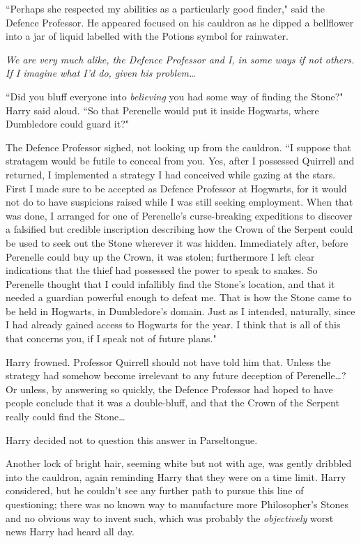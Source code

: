``Perhaps she respected my abilities as a particularly good finder," said the Defence Professor. He appeared focused on his cauldron as he dipped a bellflower into a jar of liquid labelled with the Potions symbol for rainwater.

\emph{We are very much alike, the Defence Professor and I, in some ways if not others. If I imagine what I'd do, given his problem…}

``Did you bluff everyone into \emph{believing} you had some way of finding the Stone?" Harry said aloud. ``So that Perenelle would put it inside Hogwarts, where Dumbledore could guard it?"

The Defence Professor sighed, not looking up from the cauldron. ``I suppose that stratagem would be futile to conceal from you. Yes, after I possessed Quirrell and returned, I implemented a strategy I had conceived while gazing at the stars. First I made sure to be accepted as Defence Professor at Hogwarts, for it would not do to have suspicions raised while I was still seeking employment. When that was done, I arranged for one of Perenelle's curse-breaking expeditions to discover a falsified but credible inscription describing how the Crown of the Serpent could be used to seek out the Stone wherever it was hidden. Immediately after, before Perenelle could buy up the Crown, it was stolen; furthermore I left clear indications that the thief had possessed the power to speak to snakes. So Perenelle thought that I could infallibly find the Stone's location, and that it needed a guardian powerful enough to defeat me. That is how the Stone came to be held in Hogwarts, in Dumbledore's domain. Just as I intended, naturally, since I had already gained access to Hogwarts for the year. I think that is all of this that concerns you, if I speak not of future plans."

Harry frowned. Professor Quirrell should not have told him that. Unless the strategy had somehow become irrelevant to any future deception of Perenelle…? Or unless, by answering so quickly, the Defence Professor had hoped to have people conclude that it was a double-bluff, and that the Crown of the Serpent really could find the Stone…

Harry decided not to question this answer in Parseltongue.

Another lock of bright hair, seeming white but not with age, was gently dribbled into the cauldron, again reminding Harry that they were on a time limit. Harry considered, but he couldn't see any further path to pursue this line of questioning; there was no known way to manufacture more Philosopher's Stones and no obvious way to invent such, which was probably the \emph{objectively} worst news Harry had heard all day.

